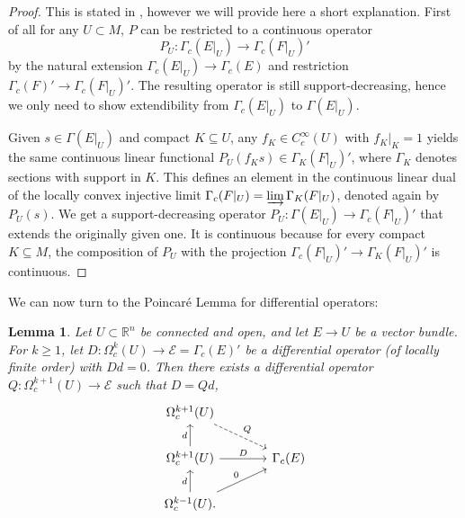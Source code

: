 \documentclass{article}
\newtheorem{Lemma}[Theorem]{Lemma}
\theoremstyle{definition}
\begin{document}
\begin{proof}
This is stated in \cite{peetreRectificationArticleCaracterisation1960}, however we will provide here a short explanation. First of all for any $U\subset M$, $P$ can be restricted to a continuous operator
$$P_U:\Gamma_c(E|_U)\to \Gamma_c(F|_U)'$$
by the natural extension $\Gamma_c(E|_U)\to \Gamma_c(E)$ and restriction $\Gamma_c(F)'\to \Gamma_c(F|_U)'$. The resulting operator is still support-decreasing, hence we only need to show extendibility from $\Gamma_c(E|_U)$ to $\Gamma(E|_U)$. 

Given $s \in  \Gamma(E|_U)$ and compact $K \subseteq U$,
any $f_{K} \in C^{\infty}_{c}(U)$ with $f_K|_{K} = 1$ yields the same continuous linear functional 
$P_U(f_{K}s) \in \Gamma_K(F|_U)'$, where $\Gamma_K$ denotes sections with support in $K$.
This defines an element  in the continuous linear 
dual of the locally convex injective limit $\Gamma_{c}(F|_U) = \varinjlim \Gamma_{K}(F|_U)$, denoted again by $P_U(s)$. 
We get a support-decreasing operator
$P_U \colon \Gamma(E|_U) \rightarrow  \Gamma_c(F|_U)'$ that extends the originally given one. It is continuous because for every compact $K\subseteq M$, the composition of $P_U$ with the projection $\Gamma_{c}(F|_U)' \rightarrow \Gamma_{K}(F|_U)'$ is continuous.
\end{proof}
We can now turn to the Poincaré Lemma for differential operators:
\begin{Lemma}\label{Lemma:exactDO}
    Let $U\subset \mathbb R^n$ be connected and open, and let $E\to U$ be a vector bundle. For $k \geq 1$, let $D:\Omega^k_c(U)\to \mathcal E=\Gamma_c(E)'$ be a differential operator (of locally finite order) with $Dd=0$. 
 Then there exists a differential operator $Q:\Omega^{k+1}_c(U)\to\mathcal{E}$ such that $D=Qd$,
\[\begin{tikzcd}[column sep=large]
	\Omega^{k+1}_{c}(U)\arrow[dr, dashed, "Q"] & \\
	\Omega^{k+1}_{c}(U)\arrow[u, "d"]\arrow[r, "D"] & \Gamma_{c}(E)\\
	\Omega^{k-1}_{c}(U) \arrow[u, "d"]  \arrow[ur, "0"].&
\end{tikzcd}\]       
\end{Lemma}
\end{document}
